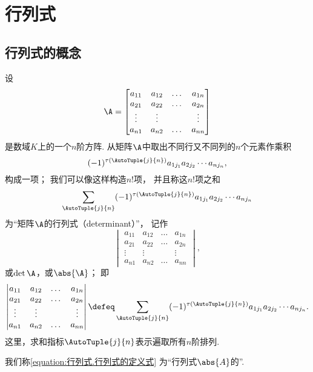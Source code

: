 \section{行列式}
\subsection{行列式的概念}
\begin{definition}
设\[
	\A = \begin{bmatrix}
		a_{11} & a_{12} & \dots & a_{1n} \\
		a_{21} & a_{22} & \dots & a_{2n} \\
		\vdots & \vdots & & \vdots \\
		a_{n1} & a_{n2} & \dots & a_{nn}
	\end{bmatrix}
\]是数域\(K\)上的一个\(n\)阶方阵.
从矩阵\(\A\)中取出不同行又不同列的\(n\)个元素作乘积
\begin{equation}\label{equation:行列式.行列式的项1}
	(-1)^{\tau(\AutoTuple{j}{n})}
	a_{1 j_1} a_{2 j_2} \dotsm a_{n j_n},
\end{equation}
构成一项；%
我们可以像这样构造\(n!\)项，
并且称这\(n!\)项之和\[
\sum_{\AutoTuple{j}{n}}
(-1)^{\tau(\AutoTuple{j}{n})}
a_{1 j_1} a_{2 j_2} \dotsm a_{n j_n}
\]为“矩阵\(\A\)的行列式（determinant）”，
记作\[
\begin{vmatrix}
a_{11} & a_{12} & \dots & a_{1n} \\
a_{21} & a_{22} & \dots & a_{2n} \\
\vdots & \vdots & & \vdots \\
a_{n1} & a_{n2} & \dots & a_{nn}
\end{vmatrix},
\]或\(\det\A\)，或\(\abs{\A}\)；
即
\begin{equation}\label{equation:行列式.行列式的定义式}
\begin{vmatrix}
a_{11} & a_{12} & \dots & a_{1n} \\
a_{21} & a_{22} & \dots & a_{2n} \\
\vdots & \vdots & & \vdots \\
a_{n1} & a_{n2} & \dots & a_{nn}
\end{vmatrix}
\defeq
\sum_{\AutoTuple{j}{n}}
(-1)^{\tau(\AutoTuple{j}{n})}
a_{1 j_1} a_{2 j_2} \dotsm a_{n j_n}.
\end{equation}
这里，求和指标\(\AutoTuple{j}{n}\)表示遍取所有\(n\)阶排列.

我们称\cref{equation:行列式.行列式的定义式}
为“行列式\(\abs{A}\)的”.
\end{definition}

